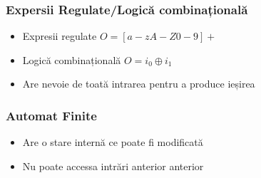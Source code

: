 \begin{frame}
    \frametitle{Expersii Regulate/Logică combinațională}
    \newsavebox{\asciiregular}
    \begin{lrbox}{\asciiregular}
        \begin{varwidth}{\maxdimen}
        \end{varwidth}
    \end{lrbox}%

    \begin{figure}[h]
        \centering
        \scalebox{0.8}{\usebox{\asciiregular}}
    \end{figure}
    \begin{itemize}
        \item Expresii regulate $O = [a-zA-Z0-9]+$
        \item Logică combinațională $O = i_0 \oplus i_1$
        \item Are nevoie de toată intrarea pentru a produce ieșirea
    \end{itemize}
\end{frame}

\begin{frame}
    \frametitle{Automat Finite}
    \newsavebox{\asciifsm}
    \begin{lrbox}{\asciifsm}
        \begin{varwidth}{\maxdimen}
        \end{varwidth}
    \end{lrbox}%

    \begin{figure}[h]
        \centering
        \scalebox{0.8}{\usebox{\asciifsm}}
    \end{figure}
    \begin{itemize}
        \item Are o stare internă ce poate fi modificată
        \item Nu poate accessa intrări anterior anterior
    \end{itemize}
\end{frame}


